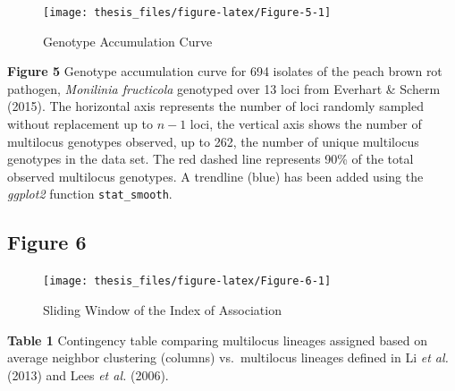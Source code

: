 \documentclass[double,12pt]{beavtex}
\begin{document}
  \begin{figure}
  
  {\centering \texttt{[image: thesis\_files/figure-latex/Figure-5-1]} 
  
  }
  
  \caption[Genotype Accumulation Curve]{Genotype Accumulation Curve}\label{fig:Figure-5}
  \end{figure}
  
  \textbf{Figure 5} Genotype accumulation curve for 694 isolates of the
  peach brown rot pathogen, \emph{Monilinia fructicola} genotyped over 13
  loci from Everhart \& Scherm (2015). The horizontal axis represents the
  number of loci randomly sampled without replacement up to \(n - 1\)
  loci, the vertical axis shows the number of multilocus genotypes
  observed, up to 262, the number of unique multilocus genotypes in the
  data set. The red dashed line represents 90\% of the total observed
  multilocus genotypes. A trendline (blue) has been added using the
  \emph{ggplot2} function \texttt{stat\_smooth}.
  
  \newpage
  
  \subsection{Figure 6}\label{figure-6}
  
  \begin{figure}
  
  {\centering \texttt{[image: thesis\_files/figure-latex/Figure-6-1]} 
  
  }
  
  \caption[Sliding Window of the Index of Association]{Sliding Window of the Index of Association}\label{fig:Figure-6}
  \end{figure}
  
  \newpage
  
  \textbf{Table 1} Contingency table comparing multilocus lineages
  assigned based on average neighbor clustering (columns) vs.~multilocus
  lineages defined in Li \emph{et al.} (2013) and Lees \emph{et al.}
  (2006).
  
\end{document}
